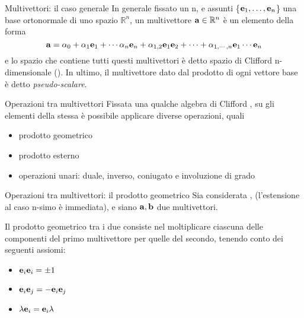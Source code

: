 \begin{frame}{Multivettori: il caso generale}
    In generale fissato un n, e assunti \{\(\mathbf{e}_{1}, \ldots, \mathbf{e}_{n}\)\}
    una base ortonormale di uno spazio \(\mathbb{R}^{n}\),
    un multivettore \(\mathbf{a} \in \mathbb{R}^{n}\) è un elemento della forma
    \[
        \mathbf{a} = \alpha_{0} + \alpha_{1}\mathbf{e}_{1} + \cdots \alpha_{n}\mathbf{e}_{n}
            + \alpha_{1,2}\mathbf{e}_{1}\mathbf{e}_{2} + \cdots 
            + \alpha_{1, \cdots, n}\mathbf{e}_{1} \cdots \mathbf{e}_{n}
    \]
    e lo spazio che contiene tutti questi multivettori è detto spazio di Clifford
    n-dimensionale (\Clifford). 
    In ultimo, il multivettore dato dal prodotto di ogni vettore base è detto
    \emph{pseudo-scalare}.
\end{frame}
\begin{frame}{Operazioni tra multivettori}
    Fissata una qualche algebra di Clifford \Clifford, 
    su gli elementi della stessa è possibile applicare diverse operazioni,
    quali 
    \begin{itemize}
        \item prodotto geometrico
        \item prodotto esterno
        \item operazioni unari: duale, inverso, coniugato e involuzione di grado
    \end{itemize}
\end{frame}
\begin{frame}{Operazioni tra multivettori: il prodotto geometrico}
    Sia considerata \Clifford[2], (l'estensione al caso n-simo è immediata),
    e siano \(\mathbf{a}, \mathbf{b}\) due multivettori.

    Il prodotto geometrico tra i due consiste nel moltiplicare ciascuna delle 
    componenti del primo multivettore per quelle del secondo, 
    tenendo conto dei seguenti assiomi:
    \begin{itemize}
        \item \(\mathbf{e}_{i}\mathbf{e}_{i} = \pm 1\)
        \item \(\mathbf{e}_{i}\mathbf{e}_{j} = -\mathbf{e}_{i}\mathbf{e}_{j}\)
        \item \(\lambda\mathbf{e}_{i} = \mathbf{e}_{i}\lambda\)
    \end{itemize}
\end{frame}
